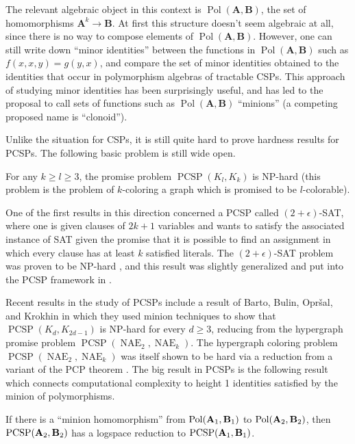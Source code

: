 \documentclass[letterpaper,11pt]{article}
\DeclareMathOperator{\Pol}{Pol}
\begin{document}
The relevant algebraic object in this context is $\Pol(\mathbf{A},\mathbf{B})$, the set of homomorphisms $\mathbf{A}^k \rightarrow \mathbf{B}$. At first this structure doesn't seem algebraic at all, since there is no way to compose elements of $\Pol(\mathbf{A},\mathbf{B})$. However, one can still write down ``minor identities'' between the functions in $\Pol(\mathbf{A},\mathbf{B})$ such as $f(x,x,y) = g(y,x)$, and compare the set of minor identities obtained to the identities that occur in polymorphism algebras of tractable CSPs. This approach of studying minor identities has been surprisingly useful, and has led to the proposal to call sets of functions such as $\Pol(\mathbf{A},\mathbf{B})$ ``minions'' (a competing proposed name is ``clonoid'').

Unlike the situation for CSPs, it is still quite hard to prove hardness results for PCSPs. The following basic problem is still wide open.

\begin{conj} For any $k \ge l \ge 3$, the promise problem $\operatorname{PCSP}(K_l,K_k)$ is NP-hard (this problem is the problem of $k$-coloring a graph which is promised to be $l$-colorable).
\end{conj}

One of the first results in this direction concerned a PCSP called $(2+\epsilon)$-SAT, where one is given clauses of $2k+1$ variables and wants to satisfy the associated instance of SAT given the promise that it is possible to find an assignment in which every clause has at least $k$ satisfied literals. The $(2+\epsilon)$-SAT problem was proven to be NP-hard \cite{2+epsilon}, and this result was slightly generalized and put into the PCSP framework in \cite{pcsp-symmetric-boolean}.

Recent results in the study of PCSPs include a result of Barto, Bulin, Opr\v{s}al, and Krokhin \cite{pcsp-coloring-full} in which they used minion techniques to show that $\operatorname{PCSP}(K_d, K_{2d-1})$ is NP-hard for every $d \ge 3$, reducing from the hypergraph promise problem $\operatorname{PCSP}(\operatorname{NAE}_2,\operatorname{NAE}_k)$. The hypergraph coloring problem $\operatorname{PCSP}(\operatorname{NAE}_2,\operatorname{NAE}_k)$ was itself shown to be hard via a reduction from a variant of the PCP theorem \cite{hypergraph-promise-hardness}. The big result in PCSPs is the following result which connects computational complexity to height 1 identities satisfied by the minion of polymorphisms.

\begin{thm} If there is a ``minion homomorphism'' from $\Pol(\fA_1,\fB_1)$ to $\Pol(\fA_2,\fB_2)$, then $\operatorname{PCSP}(\mathbf{A}_2,\mathbf{B}_2)$ has a logspace reduction to $\operatorname{PCSP}(\mathbf{A}_1,\mathbf{B}_1)$.
\end{thm}
\end{document}
